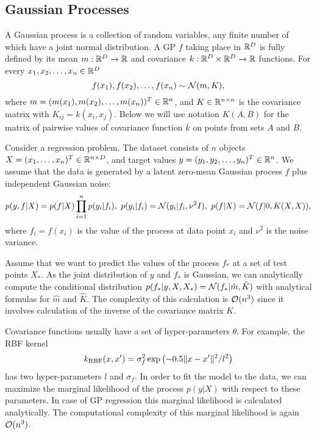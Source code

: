 \subsection{Gaussian Processes}
  A Gaussian process is a collection of random variables, any finite number of
  which have a joint normal distribution. A GP $f$ taking place in $\mathbb{R}^D$ is
  fully defined by its mean $m: \mathbb{R}^D \rightarrow \mathbb{R}$ and covariance
  $k: \mathbb{R}^D \times \mathbb{R}^D \rightarrow \mathbb{R}$ functions. For every $x_1, x_2, \ldots, x_n \in \mathbb{R}^D$
  \[
    f(x_1), f(x_2), \ldots, f(x_n) \sim \mathcal{N}(m, K),
  \]
  where $m = (m(x_1), m(x_2), \ldots, m(x_n))^T \in \mathbb{R}^n$, and
  $K\in \mathbb{R}^{n \times n}$ is the covariance matrix with $K_{ij}=k(x_i,x_j)$. Below we will use notation $K(A, B)$ for the matrix of pairwise
  values of covariance function $k$ on points from sets $A$ and $B$.

  Consider a regression problem. The dataset consists of
  $n$ objects $X = (x_1, \ldots, x_n)^T \in \mathbb{R}^{n \times D}$, and target values
  $y = (y_1, y_2, \ldots, y_n)^T \in \mathbb{R}^n$. We assume that the data is
  generated by a latent zero-mean Gaussian process $f$ plus independent Gaussian noise:
  \begin{equation}
    p(y,f | X) = p(f | X)\prod_{i=1}^np(y_i | f_i),\ p(y_i | f_i) = \mathcal{N}(y_i | f_i, \nu^2 I),\ p(f | X) = \mathcal{N}(f | 0, K(X,X)), 
    \label{gp_model}
  \end{equation}
  where $f_i=f(x_i)$ is the value of the process at data point $x_i$ and $\nu^2$ is the noise variance.

  Assume that we want to predict the values of the process $f_*$ at a set of test
  points $X_*$. As the joint distribution of $y$ and $f_*$ is Gaussian, we can analytically
  compute the conditional distribution $p(f_* | y, X, X_*) = \mathcal{N}(f_*|\hat{m},\hat{K})$ with analytical formulas for $\hat{m}$ and $\hat{K}$. The complexity of this calculation is $\mathcal{O}(n^3)$ since it involves calculation of the inverse of the covariance matrix $K$.
  
  Covariance functions usually have a set of hyper-parameters $\theta$. For example, the RBF kernel
  \[
    k_{\mbox{\scriptsize RBF}} (x, x') = \sigma_f^2 \exp\left(- 0.5 \Vert x - x'\Vert^2 / l^2 \right)
  \]
  has two hyper-parameters $l$ and $\sigma_f$. In order to fit the model to the data,
  we can maximize the marginal likelihood of the process $p(y|X)$ with respect to these
  parameters. In case of GP regression this marginal likelihood is calculated analytically. The computational complexity of this marginal likelihood is again $\mathcal{O}(n^3)$.

